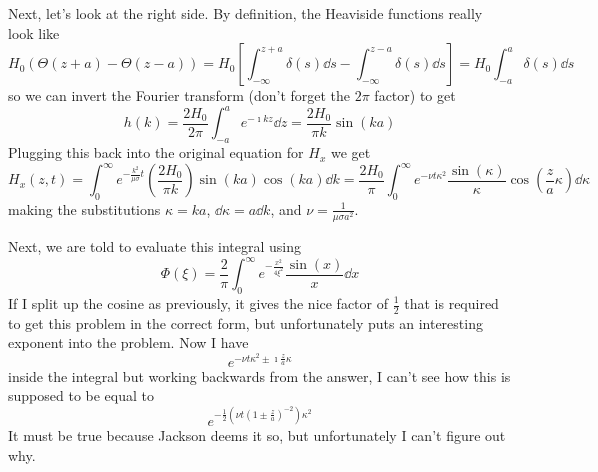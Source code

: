 \documentclass[a4paper,twoside]{article}
\begin{document}
\begin{problem}
    Next, let's look at the right side. By definition, the Heaviside functions really look like
    \begin{equation}
        H_0(\Theta(z+a) - \Theta(z-a)) = H_0 \left[ \int_{- \infty}^{z+a} \delta(s) \dd{s} - \int_{- \infty}^{z-a} \delta(s) \dd{s} \right] = H_0 \int_{-a}^{a} \delta(s) \dd{s}
    \end{equation}
    so we can invert the Fourier transform (don't forget the $ 2 \pi $ factor) to get
    \begin{equation}
        h(k) = \frac{2 H_0}{2 \pi} \int_{-a}^{a} e^{-\imath k z} \dd{z} = \frac{2 H_0}{\pi k} \sin(ka)
    \end{equation}
    Plugging this back into the original equation for $ H_x $ we get
    \begin{equation}
        H_x(z,t) = \int_{0}^{\infty} e^{- \frac{k^2}{\mu \sigma} t} \left( \frac{2 H_0}{\pi k} \right) \sin(ka) \cos(ka) \dd{k} = \frac{2 H_0}{\pi} \int_{0}^{\infty} e^{- \nu t \kappa^2} \frac{\sin(\kappa)}{\kappa} \cos(\frac{z}{a} \kappa) \dd{\kappa}
    \end{equation}
    making the substitutions $ \kappa = ka $, $ \dd{\kappa} = a \dd{k} $, and $ \nu = \frac{1}{\mu \sigma a^2} $.

    Next, we are told to evaluate this integral using
    \begin{equation}
        \Phi(\xi) = \frac{2}{\pi} \int_{0}^{\infty} e^{- \frac{x^2}{4 \xi^2}} \frac{\sin(x)}{x} \dd{x}
    \end{equation}
    If I split up the cosine as previously, it gives the nice factor of $ \frac{1}{2} $ that is required to get this problem in the correct form, but unfortunately puts an interesting exponent into the problem. Now I have
    \begin{equation}
        e^{- \nu t \kappa^2 \pm \imath \frac{z}{a} \kappa}
    \end{equation}
    inside the integral but working backwards from the answer, I can't see how this is supposed to be equal to
    \begin{equation}
        e^{- \frac{1}{2} \left( \nu t \left( 1 \pm \frac{z}{a} \right)^{-2} \right) \kappa^2}
    \end{equation}
    It must be true because Jackson deems it so, but unfortunately I can't figure out why.
\end{problem}
\end{document}
